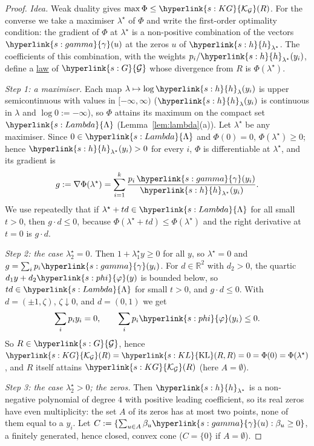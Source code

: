 \documentclass[11pt]{article}
\newcommand{\R}{\mathbb{R}}
\newcommand{\sy}[2]{{\hyperlink{#1}{#2}}}
\newcommand{\term}[2]{\hyperlink{#1}{#2}}
\newcommand{\KL}{\sy{s:KL}{\mathrm{KL}}}
\newcommand{\phik}{\sy{s:phi}{\varphi}}
\newcommand{\Gk}{\sy{s:G}{\mathcal{G}}}
\newcommand{\KG}{\sy{s:KG}{\mathcal{K}_{\mathcal{G}}}}
\newcommand{\hl}{\sy{s:h}{h}}
\newcommand{\gam}{\sy{s:gamma}{\gamma}}
\newcommand{\Lam}{\sy{s:Lambda}{\Lambda}}
\begin{document}
\begin{proof}
\emph{Idea.} Weak duality gives $\max\Phi\le\KG(R)$. For the converse we take a maximiser $\lambda^\star$ of $\Phi$ and
write the first-order optimality condition: the gradient of $\Phi$ at $\lambda^\star$ is a non-positive combination
of the vectors $\gam(u)$ at the zeros $u$ of $\hl_{\lambda^\star}$. The coefficients of this combination, with the weights
$p_i/\hl_{\lambda^\star}(y_i)$, define a \term{w:law}{law} of $\Gk$ whose divergence from $R$ is $\Phi(\lambda^\star)$.

\emph{Step 1: a maximiser.} Each map $\lambda\mapsto\log\hl_\lambda(y_i)$ is upper semicontinuous with values in $[-\infty,\infty)$
($\hl_\lambda(y_i)$ is continuous in $\lambda$ and $\log0:=-\infty$), so $\Phi$ attains its maximum on the compact set
$\Lam$ (Lemma~\ref{lem:lambda}(a)). Let $\lambda^\star$ be any maximiser. Since $0\in\Lam$ and $\Phi(0)=0$, $\Phi(\lambda^\star)\ge0$; hence
$\hl_{\lambda^\star}(y_i)>0$ for every $i$, $\Phi$ is differentiable at $\lambda^\star$, and its gradient is
\begin{equation*}
  g:=\nabla\Phi(\lambda^\star)=\sum_{i=1}^k\frac{p_i\,\gam(y_i)}{\hl_{\lambda^\star}(y_i)} .
\end{equation*}
We use repeatedly that if $\lambda^\star+td\in\Lam$ for all small $t>0$, then $g\cdot d\le0$, because
$\Phi(\lambda^\star+td)\le\Phi(\lambda^\star)$ and the right derivative at $t=0$ is $g\cdot d$.

\emph{Step 2: the case $\lambda^\star_2=0$.} Then $1+\lambda^\star_1y\ge0$ for all $y$, so $\lambda^\star=0$ and $g=\sum_ip_i\gam(y_i)$.
For $d\in\R^2$ with $d_2>0$, the quartic $d_1y+d_2\phik(y)$ is bounded below, so $td\in\Lam$ for small $t>0$, and
$g\cdot d\le0$. With $d=(\pm1,\zeta)$, $\zeta\downarrow0$, and $d=(0,1)$ we get
\begin{equation*}
  \sum_ip_iy_i=0,\qquad \sum_ip_i\phik(y_i)\le0 .
\end{equation*}
So $R\in\Gk$, hence $\KG(R)=\KL(R,R)=0=\Phi(0)=\Phi(\lambda^\star)$, and $R$ itself attains $\KG(R)$ (here $A=\emptyset$).

\emph{Step 3: the case $\lambda^\star_2>0$; the zeros.} Then $\hl_{\lambda^\star}$ is a non-negative polynomial of degree $4$
with positive leading coefficient, so its real zeros have even multiplicity: the set $A$ of its zeros has at
most two points, none of them equal to a $y_i$. Let $C:=\{\sum_{u\in A}\beta_u\gam(u):\beta_u\ge0\}$, a finitely generated, hence
closed, convex cone ($C=\{0\}$ if $A=\emptyset$).


\end{proof}
\end{document}
